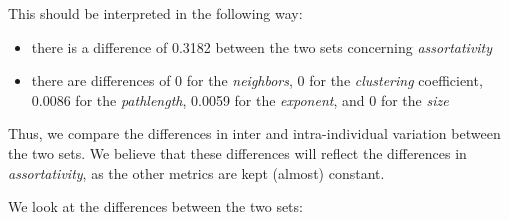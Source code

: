 \documentclass[
]{article}
\providecommand{\tightlist}{%
  \setlength{\itemsep}{0pt}\setlength{\parskip}{0pt}}
\begin{document}
This should be interpreted in the following way:

\begin{itemize}
\tightlist
\item
  there is a difference of 0.3182 between the two sets concerning
  \emph{assortativity}
\item
  there are differences of 0 for the \emph{neighbors}, 0 for the
  \emph{clustering} coefficient, 0.0086 for the \emph{pathlength},
  0.0059 for the \emph{exponent}, and 0 for the \emph{size}
\end{itemize}

Thus, we compare the differences in inter and intra-individual variation
between the two sets. We believe that these differences will reflect the
differences in \emph{assortativity}, as the other metrics are kept
(almost) constant.

We look at the differences between the two sets:
\end{document}
